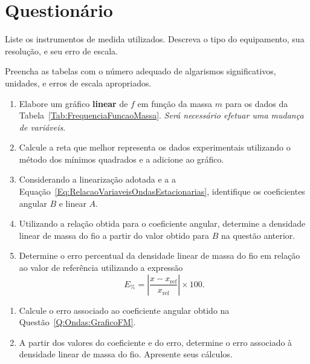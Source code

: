 \vspace{5mm}

\section{Questionário}

\begin{question}[type={exam}]{1}
Liste os instrumentos de medida utilizados. Descreva o tipo do equipamento, sua resolução, e seu erro de escala.
\end{question}

\begin{question}[type={exam}]{2}
Preencha as tabelas com o número adequado de algarismos significativos, unidades, e erros de escala apropriados. 
\end{question}

\begin{question}[type={exam}]{1.5}\label{Q:Ondas:GraficoFM}
\begin{enumerate}[label=\roman*.]
\item Elabore um gráfico \textbf{linear} de $f$ em função da massa $m$ para os dados da Tabela~\ref{Tab:FrequenciaFuncaoMassa}. \emph{Será necessário efetuar uma mudança de variáveis}.
\item Calcule a reta que melhor representa os dados experimentais utilizando o método dos mínimos quadrados e a adicione ao gráfico.
\item Considerando a linearização adotada e a a Equação~\eqref{Eq:RelacaoVariaveisOndasEstacionarias}, identifique os coeficientes angular $B$ e linear $A$.
\item Utilizando a relação obtida para o coeficiente angular, determine a densidade linear de massa do fio a partir do valor obtido para $B$ na questão anterior.
\item Determine o erro percentual da densidade linear de massa do fio em relação ao valor de referência utilizando a expressão 
\begin{equation}
	E_{\%} = \left|\frac{x-x_{\textrm{ref}}}{x_{\textrm{ref}}}\right| \times 100.
\end{equation}
\end{enumerate}
\end{question}

\begin{question}[type={exam}]{2}
\begin{enumerate}[label=\roman*.]
\item Calcule o erro associado ao coeficiente angular obtido na Questão~\ref{Q:Ondas:GraficoFM}.
\item A partir dos valores do coeficiente e do erro, determine o erro associado à densidade linear de massa do fio. Apresente seus cálculos.
\end{enumerate}
\end{question}

